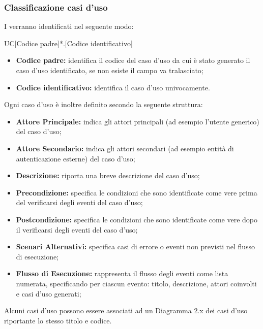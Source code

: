 \documentclass[../NomeDocumento.tex]{subfiles}
\begin{document}
	
	
		
	\subsubsection{Classificazione casi d’uso} 
	
I  verranno identificati nel seguente modo: 

\begin{center}
	UC[Codice padre]*.[Codice identificativo]
\end{center}

\begin{itemize}
	\item \textbf{Codice padre:} identifica il codice del caso d'uso da cui è stato generato il caso d'uso identificato, se non esiste il campo va tralasciato;
	\item \textbf{Codice identificativo:} identifica il caso d'uso univocamente.
\end{itemize}

	\noindent Ogni caso d'uso è inoltre definito secondo la seguente struttura:
\begin{itemize}
	\item \textbf{Attore Principale:} indica gli attori principali (ad esempio l'utente generico) del caso d'uso;
	\item \textbf{Attore Secondario:} indica gli attori secondari (ad esempio entità di autenticazione esterne) del caso d'uso;
	\item \textbf{Descrizione:} riporta una breve descrizione del caso d'uso;
	\item \textbf{Precondizione:} specifica le condizioni che sono identificate come vere prima del verificarsi degli eventi del caso d'uso;
	\item \textbf{Postcondizione:} specifica le condizioni che sono identificate come vere dopo il verificarsi degli eventi del caso d'uso;
	
	\item \textbf{Scenari Alternativi:} specifica casi di errore o eventi non previsti nel flusso di esecuzione;
	\item \textbf{Flusso di Esecuzione:} rappresenta il flusso degli eventi come lista numerata, specificando per ciascun evento: titolo, descrizione, attori coinvolti e casi d'uso generati;
\end{itemize}


	Alcuni casi d'uso possono essere associati ad un Diagramma  2.x dei casi d'uso riportante lo stesso titolo e codice.
	
\end{document}
